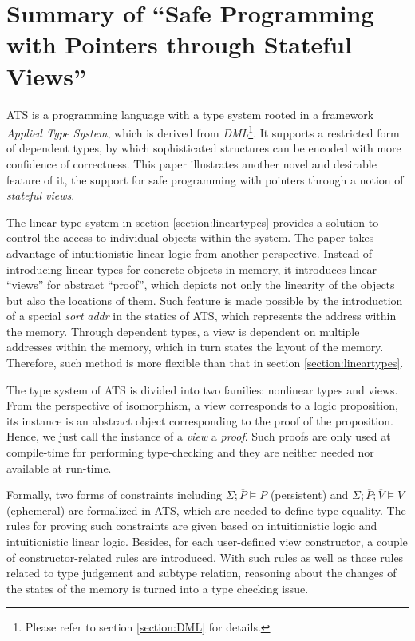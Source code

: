 \documentclass{llncs}
\begin{document}
\newpage
\section{Summary of ``Safe Programming with Pointers through Stateful Views''
  \cite{Zhu2005Safe}}
  \label{section:statefulviews}

ATS is a programming language with a type system rooted in a framework
\emph{Applied Type System}, which is derived from
\emph{DML}\footnote{Please refer to section \ref{section:DML} for details.}.
It supports a restricted form of dependent types, by which sophisticated
structures can be encoded with more confidence of correctness.
This paper illustrates another
novel and desirable feature of it, the support for safe programming with
pointers through a notion of \emph{stateful views}.

The linear type system in section \ref{section:lineartypes} provides a solution
to control the access to individual objects within the system. The paper takes
advantage of intuitionistic linear logic from another perspective. Instead of
introducing linear types for concrete objects in memory, it introduces linear
``views'' for abstract ``proof'', which depicts not only the linearity of the 
objects but also the locations of them.
Such feature is made possible by the introduction of a special \emph{sort}
\emph{addr} in the statics of ATS, which represents the address within the
memory. Through dependent types, a view is dependent on multiple addresses
within the memory, which in turn states the layout of the memory. Therefore,
such method is more flexible than that in section \ref{section:lineartypes}.

The type system of ATS is divided
into two families: nonlinear types and views. From the perspective of
isomorphism, a view corresponds to a logic proposition, its instance is an 
abstract object corresponding to the proof of the proposition. Hence, we just
call the instance of a \emph{view} a \emph{proof}. Such proofs are only used at
compile-time for performing type-checking and they are neither needed nor
available at run-time.

Formally, two forms of constraints including $\Sigma; \overline{P} 
\models P$ (persistent) and $\Sigma; \overline{P}; \overline{V} 
\models V$ (ephemeral) are formalized in ATS, which are needed to
define type equality. The rules for proving such constraints are given based on
intuitionistic logic and intuitionistic linear logic. Besides, for each
user-defined view constructor, a couple of constructor-related rules are
introduced. With such rules as well as those rules related to type judgement and
subtype relation, reasoning about the changes of the states of the memory is
turned into a type checking issue.
\end{document}
